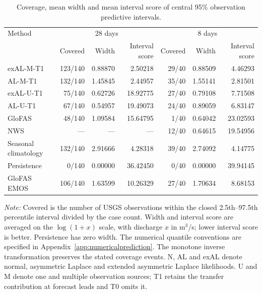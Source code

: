 \begin{table}[!htbp]
\centering
\begin{threeparttable}
\caption{Coverage, mean width and mean interval score of central 95\% observation predictive intervals.}
\label{tab:no_refit_calibration}
\fontsize{8.5}{10.5}\selectfont
\setlength{\tabcolsep}{4pt}
\begin{tabular}{lrrrrrr}
\hline
Method & \multicolumn{3}{c}{28 days} & \multicolumn{3}{c}{8 days} \\  & Covered & Width & Interval score & Covered & Width & Interval score \\
\hline
exAL-M-T1 & 123/140 & 0.88870 & 2.50218 & 29/40 & 0.88509 & 4.46293 \\
AL-M-T1 & 132/140 & 1.45845 & 2.44957 & 35/40 & 1.55141 & 2.81501 \\
exAL-U-T1 & 75/140 & 0.62726 & 18.92775 & 27/40 & 0.79108 & 7.71508 \\
AL-U-T1 & 67/140 & 0.54957 & 19.49073 & 24/40 & 0.89059 & 6.83147 \\
GloFAS & 48/140 & 1.09584 & 15.64795 & 1/40 & 0.64042 & 23.02593 \\
NWS & --- & --- & --- & 12/40 & 0.64615 & 19.54956 \\
Seasonal climatology & 132/140 & 2.91666 & 4.28318 & 39/40 & 2.74092 & 4.14775 \\
Persistence & 0/140 & 0.00000 & 36.42450 & 0/40 & 0.00000 & 39.94145 \\
GloFAS EMOS & 106/140 & 1.63599 & 10.26329 & 27/40 & 1.70634 & 8.68153 \\
\hline
\end{tabular}
\begin{tablenotes}
\fontsize{8}{10}\selectfont
\item \textit{Note:} Covered is the number of USGS observations within the closed 2.5th--97.5th percentile interval divided by the case count. Width and interval score are averaged on the $\log(1+x)$ scale, with discharge $x$ in m$^3$/s; lower interval score is better. Persistence has zero width. The numerical quantile conventions are specified in Appendix~\ref{app:numericalprediction}. The monotone inverse transformation preserves the stated coverage events. N, AL and exAL denote normal, asymmetric Laplace and extended asymmetric Laplace likelihoods. U and M denote one and multiple observation sources; T1 retains the transfer contribution at forecast leads and T0 omits it.
\end{tablenotes}
\end{threeparttable}
\end{table}
